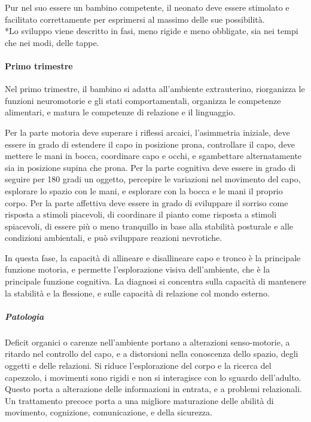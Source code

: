 Pur nel suo essere un bambino competente, il neonato deve essere stimolato e facilitato correttamente per esprimersi
al massimo delle sue possibilità. \\*Lo sviluppo viene descritto in fasi, meno rigide e meno obbligate, sia nei tempi
che nei modi, delle tappe.

\paragraph{Primo trimestre}
Nel primo trimestre, il bambino si adatta all'ambiente extrauterino, riorganizza le funzioni neuromotorie e gli stati
comportamentali, organizza le competenze alimentari, e matura le competenze di relazione e il linguaggio.

Per la parte motoria deve superare i riflessi arcaici, l'asimmetria iniziale, deve essere in grado di estendere il
capo in posizione prona, controllare il capo, deve mettere le mani in bocca, coordinare capo e occhi, e sgambettare
alternatamente sia in posizione supina che prona. 
Per la parte cognitiva deve essere in grado di seguire per 180 gradi un oggetto, percepire le variazioni nel movimento
del capo, esplorare lo spazio con le mani, e esplorare con la bocca e le mani il proprio corpo.
Per la parte affettiva deve essere in grado di sviluppare il sorriso come risposta a stimoli piacevoli, di coordinare
il pianto come risposta a stimoli spiacevoli, di essere più o meno tranquillo in base alla stabilità posturale e alle
condizioni ambientali, e può sviluppare reazioni nevrotiche.

In questa fase, la capacità di allineare e disallineare capo e tronco è la principale funzione motoria, e permette
l'esplorazione visiva dell'ambiente, che è la principale funzione cognitiva. La diagnosi si concentra sulla capacità di
mantenere la stabilità e la flessione, e sulle capacità di relazione col mondo esterno.

\subparagraph{Patologia}
Deficit organici o carenze nell'ambiente portano a alterazioni senso-motorie, a ritardo nel controllo del capo, e a
distorsioni nella conoscenza dello spazio, degli oggetti e delle relazioni.
Si riduce l'esplorazione del corpo e la ricerca del capezzolo, i movimenti sono rigidi e non si interagisce con lo sguardo
dell'adulto. Questo porta a alterazione delle informazioni in entrata, e a problemi relazionali.
Un trattamento precoce porta a una migliore maturazione delle abilità di movimento, cognizione, comunicazione, e della
sicurezza.

